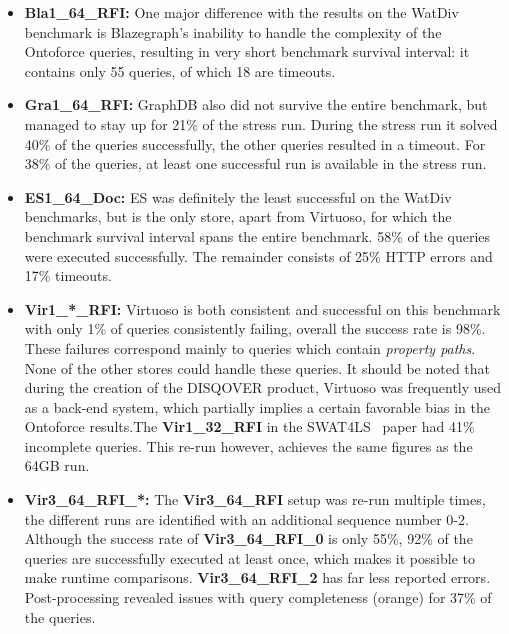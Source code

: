 \documentclass[twocolumn]{bmcart}%
\begin{document}
\begin{itemize}
	\item \textbf{Bla1\_64\_RFI:} One major difference with the results on the WatDiv benchmark is Blazegraph's inability to handle the complexity of the Ontoforce queries, resulting in very short benchmark survival interval: it contains only 55 queries, of which 18 are timeouts.
	
	\item \textbf{Gra1\_64\_RFI:} GraphDB also did not survive the entire benchmark, but managed to stay up for 21\% of the stress run. During the stress run it solved 40\% of the queries successfully, the other queries resulted in a timeout. For 38\% of the queries, at least one successful run is available in the stress run.
	
	\item \textbf{ES1\_64\_Doc:} ES was definitely the least successful on the WatDiv benchmarks, but is the only store, apart from Virtuoso, for which the benchmark survival interval spans the entire benchmark. 58\% of the queries were executed successfully. The remainder consists of 25\% HTTP errors and 17\% timeouts. 
	\item \textbf{Vir1\_*\_RFI:} Virtuoso is both consistent and successful on this benchmark with only 1\% of queries consistently failing, overall the success rate is 98\%. These failures correspond mainly to queries which contain \emph{property paths}. None of the other stores could handle these queries. 
	It should be noted that during the creation of the DISQOVER product, Virtuoso was frequently used as a back-end system, which partially implies a certain favorable bias in the Ontoforce results.The \textbf{Vir1\_32\_RFI} in the SWAT4LS~\cite{dewitte_swat4ls_2016} paper had 41\% incomplete queries. This re-run however, achieves the same figures as the 64GB run.
	
	\item \textbf{Vir3\_64\_RFI\_*:} The  \textbf{Vir3\_64\_RFI} setup was re-run multiple times, the different runs are identified with an additional sequence number 0-2.
	Although the success rate of \textbf{Vir3\_64\_RFI\_0} is only 55\%, 92\% of the queries are successfully executed at least once, which makes it possible to make runtime comparisons. \textbf{Vir3\_64\_RFI\_2} has far less reported errors. Post-processing revealed issues with query completeness (orange) for 37\% of the queries.
\end{itemize}
\end{document}
